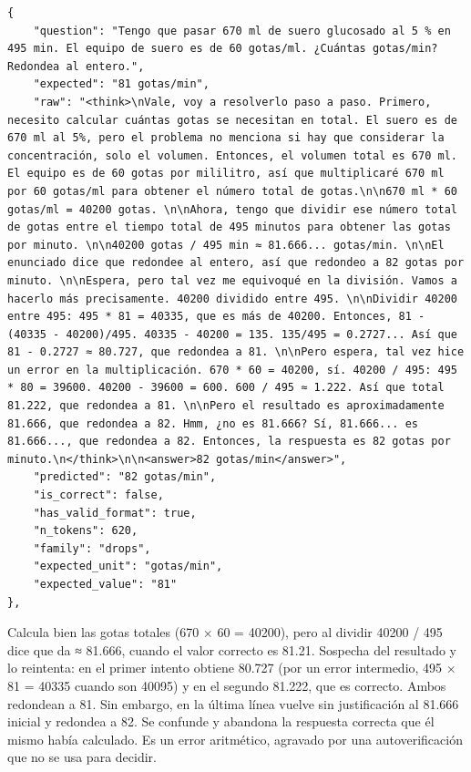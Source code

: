\begin{lstlisting}
{
    "question": "Tengo que pasar 670 ml de suero glucosado al 5 % en 495 min. El equipo de suero es de 60 gotas/ml. ¿Cuántas gotas/min? Redondea al entero.",
    "expected": "81 gotas/min",
    "raw": "<think>\nVale, voy a resolverlo paso a paso. Primero, necesito calcular cuántas gotas se necesitan en total. El suero es de 670 ml al 5%, pero el problema no menciona si hay que considerar la concentración, solo el volumen. Entonces, el volumen total es 670 ml. El equipo es de 60 gotas por mililitro, así que multiplicaré 670 ml por 60 gotas/ml para obtener el número total de gotas.\n\n670 ml * 60 gotas/ml = 40200 gotas. \n\nAhora, tengo que dividir ese número total de gotas entre el tiempo total de 495 minutos para obtener las gotas por minuto. \n\n40200 gotas / 495 min ≈ 81.666... gotas/min. \n\nEl enunciado dice que redondee al entero, así que redondeo a 82 gotas por minuto. \n\nEspera, pero tal vez me equivoqué en la división. Vamos a hacerlo más precisamente. 40200 dividido entre 495. \n\nDividir 40200 entre 495: 495 * 81 = 40335, que es más de 40200. Entonces, 81 - (40335 - 40200)/495. 40335 - 40200 = 135. 135/495 = 0.2727... Así que 81 - 0.2727 ≈ 80.727, que redondea a 81. \n\nPero espera, tal vez hice un error en la multiplicación. 670 * 60 = 40200, sí. 40200 / 495: 495 * 80 = 39600. 40200 - 39600 = 600. 600 / 495 ≈ 1.222. Así que total 81.222, que redondea a 81. \n\nPero el resultado es aproximadamente 81.666, que redondea a 82. Hmm, ¿no es 81.666? Sí, 81.666... es 81.666..., que redondea a 82. Entonces, la respuesta es 82 gotas por minuto.\n</think>\n\n<answer>82 gotas/min</answer>",
    "predicted": "82 gotas/min",
    "is_correct": false,
    "has_valid_format": true,
    "n_tokens": 620,
    "family": "drops",
    "expected_unit": "gotas/min",
    "expected_value": "81"
},
\end{lstlisting}

Calcula bien las gotas totales (670 × 60 = 40200), pero al dividir 40200 / 495 dice que da ≈ 81.666, cuando el valor correcto es 81.21. Sospecha del resultado y lo reintenta: en el primer intento obtiene 80.727 (por un error intermedio, 495 × 81 = 40335 cuando son 40095) y en el segundo 81.222, que es correcto. Ambos redondean a 81. Sin embargo, en la última línea vuelve sin justificación al 81.666 inicial y redondea a 82. Se confunde y abandona la respuesta correcta que él mismo había calculado. Es un error aritmético, agravado por una autoverificación que no se usa para decidir.

